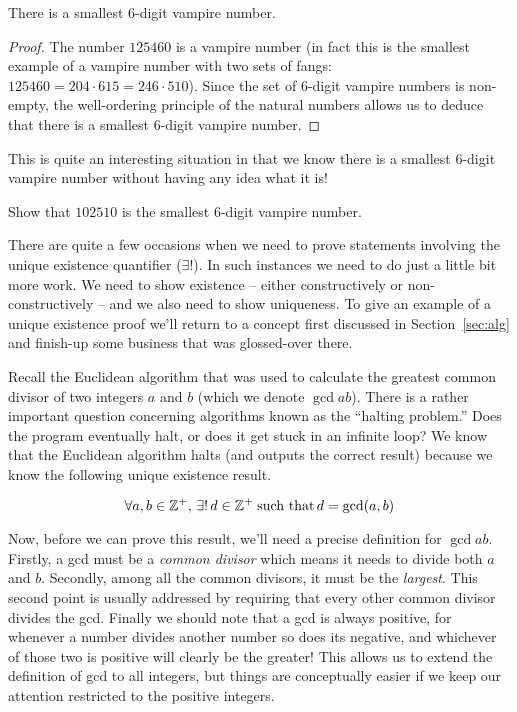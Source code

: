 \begin{thm}
There is a smallest 6-digit vampire number.
\end{thm}

\begin{proof}
The number $125460$ is a vampire number (in fact this is the smallest
example of a vampire number with two sets of fangs: 
$125460 = 204\cdot 615 = 246\cdot 510$).  Since the set of 6-digit vampire
numbers is non-empty, the well-ordering principle of the natural numbers
allows us to deduce that there is a smallest 6-digit vampire number.
\end{proof} 
 
This is quite an interesting situation in that we know there is a smallest
6-digit vampire number without having any idea what it is!

\begin{exer}
Show that $102510$ is the smallest 6-digit vampire number.
\end{exer}

There are quite a few occasions when we need to prove statements
involving the  unique existence quantifier 
($\exists !$).  In
such instances we need to do just a little bit more work.  We
need to show existence -- either constructively or non-constructively --
and we also need to show uniqueness.  To give an example of 
a unique existence proof we'll return to a concept first
discussed in Section~\ref{sec:alg} and finish-up some business
that was glossed-over there.

Recall the Euclidean algorithm that was used to calculate the 
greatest
common divisor of two integers $a$ and $b$ (which we denote $\gcd{a}{b}$).
There is a rather important question concerning algorithms known as
the ``halting problem.''  Does the program eventually halt, or does it get 
stuck in an infinite loop?  We know that the Euclidean algorithm halts
(and outputs the correct result) because we know the following
unique existence result.

\[ \forall a, b \in {\mathbb Z}^+, \, \exists ! \, d \in {\mathbb Z}^+ \; \mbox{such that} \, d=\mbox{gcd} (a, b) \]
  
Now, before we can prove this result, we'll need a precise definition
for $\gcd{a}{b}$.   Firstly, a gcd must be a \emph{common divisor} which
means it needs to divide both $a$ and $b$.  Secondly, among all the common 
divisors, it must be the \emph{largest}.  This second point is usually 
addressed
by requiring that every other common divisor divides the gcd. Finally we 
should note that a gcd is always positive, for whenever a number divides
another number so does its negative, and whichever of those two is positive
will clearly be the greater!  This allows us to extend the definition of
gcd to all integers, but things are conceptually easier if we 
keep our attention restricted to the positive integers. 

